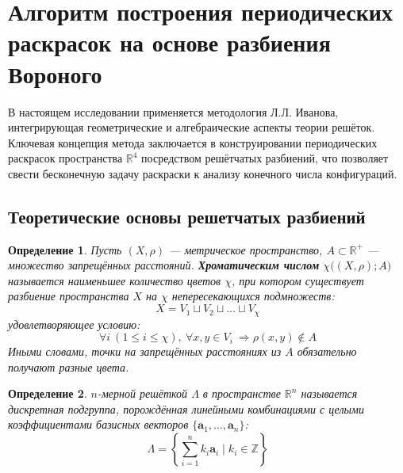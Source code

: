 \documentclass[12pt]{article}
\begin{document}
\section{Алгоритм построения периодических раскрасок на основе разбиения Вороного}

В настоящем исследовании применяется методология Л.Л. Иванова, интегрирующая геометрические и алгебраические аспекты теории решёток.
Ключевая концепция метода заключается в конструировании периодических раскрасок пространства $\mathbb{R}^4$ посредством решётчатых разбиений,
что позволяет свести бесконечную задачу раскраски к анализу конечного
числа конфигураций.

\newtheorem{definition}{Определение}
\newtheorem{theorem}{Теорема}
\newtheorem{lemma}{Лемма}

\subsection{Теоретические основы решетчатых разбиений}


\begin{definition}
Пусть $(X, \rho)$ --- метрическое пространство, $A \subset \mathbb{R}^+$ --- множество запрещённых расстояний. 
\textbf{Хроматическим числом} $\chi\big((X, \rho); A\big)$ называется наименьшее количество цветов $\chi$, 
при котором существует разбиение пространства $X$ на $\chi$ непересекающихся подмножеств:
\[
X = V_1 \sqcup V_2 \sqcup \dots \sqcup V_\chi
\]
удовлетворяющее условию:
\[
\forall i\ (1 \leq i \leq \chi),\ \forall x,y \in V_i\ \Rightarrow \rho(x,y) \notin A
\]
Иными словами, точки на запрещённых расстояниях из $A$ обязательно получают разные цвета.
\end{definition}

\begin{definition}
$n$-мерной решёткой $\Lambda$ в пространстве $\mathbb{R}^n$ называется дискретная подгруппа, порождённая линейными комбинациями с целыми коэффициентами базисных векторов $\{\mathbf{a}_1,\ldots,\mathbf{a}_n\}$:
\[
\Lambda = \left\{\sum_{i=1}^n k_i\mathbf{a}_i \mid k_i \in \mathbb{Z}\right\}
\]
\end{definition}
\end{document}
